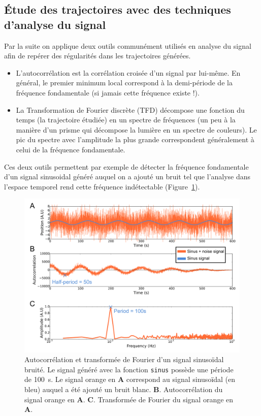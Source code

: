 \documentclass[12pt,a4paper,twoside,openright]{book}
\begin{document}
\subsection{Étude des trajectoires avec des techniques d'analyse du
signal}\label{uxe9tude-des-trajectoires-avec-des-techniques-danalyse-du-signal}

Par la suite on applique deux outils communément utilisés en analyse du
signal afin de repérer des régularités dans les trajectoires générées.

\begin{itemize}
\item
  L'autocorrélation est la corrélation croisée d'un signal par lui-même.
  En général, le premier minimum local correspond à la demi-période de
  la fréquence fondamentale (si jamais cette fréquence existe !).
\item
  La Transformation de Fourier discrète (TFD) décompose une fonction du
  temps (la trajectoire étudiée) en un spectre de fréquences (un peu à
  la manière d'un prisme qui décompose la lumière en un spectre de
  couleurs). Le pic du spectre avec l'amplitude la plus grande
  correspondent généralement à celui de la fréquence fondamentale.
\end{itemize}

Ces deux outils permettent par exemple de détecter la fréquence
fondamentale d'un signal sinusoidal généré auquel on a ajouté un bruit
tel que l'analyse dans l'espace temporel rend cette fréquence
indétectable (Figure~\ref{fig:simu-oscill-sinus}).

\begin{figure}[htbp]
\centering
\includegraphics{figures/annexes/simu_oscill_sinus.png}
\caption[Autocorrélation et transformée de Fourier d'un signal sinusoïdal bruité]{\label{fig:simu-oscill-sinus}Autocorrélation
et transformée de Fourier d'un signal sinusoïdal bruité. Le signal
généré avec la fonction \texttt{sinus} possède une période de 100~s. Le
signal orange en \textbf{A} correspond au signal sinusoïdal (en bleu)
auquel a été ajouté un bruit blanc. \textbf{B}. Autocorrélation du
signal orange en \textbf{A}. \textbf{C}. Transformée de Fourier du
signal orange en \textbf{A}.}
\end{figure}
\end{document}
